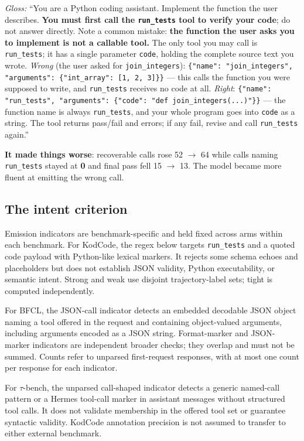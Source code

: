 \noindent\emph{Gloss:} ``You are a Python coding assistant. Implement the function the user
describes. \textbf{You must first call the \texttt{run\_tests} tool to verify your code}; do not
answer directly. Note a common mistake: \textbf{the function the user asks you to implement is not
a callable tool.} The only tool you may call is \texttt{run\_tests}; it has a single parameter
\texttt{code}, holding the complete source text you wrote. \emph{Wrong} (the user asked for
\texttt{join\_integers}): \texttt{\{"name": "join\_integers", "arguments": \{"int\_array": [1, 2,
3]\}\}} --- this calls the function you were supposed to write, and \texttt{run\_tests} receives no
code at all. \emph{Right}: \texttt{\{"name": "run\_tests", "arguments": \{"code": "def
join\_integers(...)"\}\}} --- the function name is always \texttt{run\_tests}, and your whole
program goes into \texttt{code} as a string. The tool returns pass/fail and errors; if any fail,
revise and call \texttt{run\_tests} again.''

\textbf{It made things worse}: recoverable calls rose 52 $\to$ 64 while calls naming
\texttt{run\_tests} stayed at \textbf{0} and final pass fell 15 $\to$ 13. The model became
more fluent at emitting the wrong call.

\subsection{The intent criterion}

Emission indicators are benchmark-specific and held fixed across arms within each benchmark.
For KodCode, the regex below targets \texttt{run\_tests} and a quoted code payload with
Python-like lexical markers. It rejects some schema echoes and placeholders but does not
establish JSON validity, Python executability, or semantic intent. Strong and weak use
disjoint trajectory-label sets; tight is computed independently.

For BFCL, the JSON-call indicator detects an embedded decodable JSON object naming a tool
offered in the request and containing object-valued arguments, including arguments encoded
as a JSON string. Format-marker and JSON-marker indicators are independent broader checks;
they overlap and must not be summed. Counts refer to unparsed first-request responses,
with at most one count per response for each indicator.

For $\tau$-bench, the unparsed call-shaped indicator detects a generic named-call pattern
or a Hermes tool-call marker in assistant messages without structured tool calls. It does
not validate membership in the offered tool set or guarantee syntactic validity.
KodCode annotation precision is not assumed to transfer to either external benchmark.


